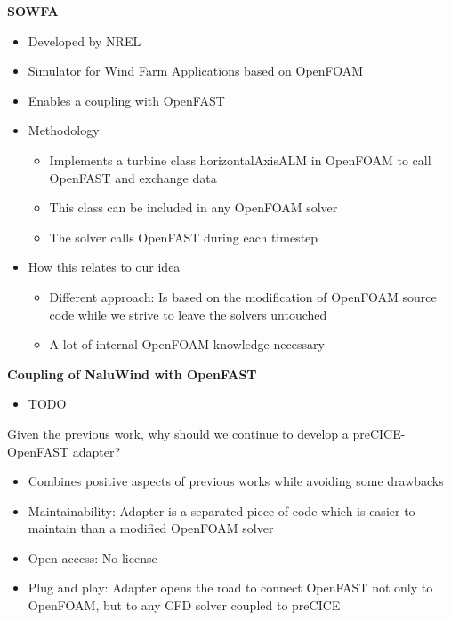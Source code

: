 \textbf{SOWFA} \cite{Churchfield:2012}
\begin{itemize}
	\item Developed by NREL
	\item Simulator for Wind Farm Applications based on OpenFOAM
	\item Enables a coupling with OpenFAST
	\item Methodology
	\begin{itemize}
		\item Implements a turbine class horizontalAxisALM in OpenFOAM to call OpenFAST and exchange data
		\item This class can be included in any OpenFOAM solver
		\item The solver calls OpenFAST during each timestep
	\end{itemize}
	\item How this relates to our idea
	\begin{itemize}
		\item Different approach: Is based on the modification of OpenFOAM source code while we strive to leave the solvers untouched
		\item A lot of internal OpenFOAM knowledge necessary
		\\
	\end{itemize}
\end{itemize}

\textbf{Coupling of NaluWind with OpenFAST} \cite{Ananthan:2019}\\
\begin{itemize}
	\item TODO\\
\end{itemize}

Given the previous work, why should we continue to develop a preCICE-OpenFAST adapter?
\begin{itemize}
	\item Combines positive aspects of previous works while avoiding some drawbacks
	\item Maintainability: Adapter is a separated piece of code which is easier to maintain than a modified OpenFOAM solver
	\item Open access: No license
	\item Plug and play: Adapter opens the road to connect OpenFAST not only to OpenFOAM, but to any CFD solver coupled to preCICE
\end{itemize}
